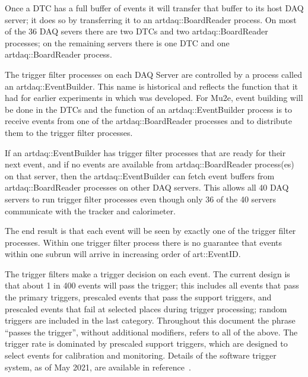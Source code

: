 Once a DTC has a full buffer of events it will transfer that buffer to its host DAQ server;
it does so by transferring it to an {\code artdaq::BoardReader} process.  On most of the
36 DAQ severs there are two DTCs and two {\code artdaq::BoardReader} processes;
on the remaining servers there is one DTC and one {\code artdaq::BoardReader} process.

The trigger filter processes on each DAQ Server are controlled by a process
called an {\code artdaq::EventBuilder}.
This name is historical and reflects the function that it had for earlier experiments in which \artdaq was developed.
For Mu2e, event building will be done in the DTCs and the function of an
{\code artdaq::EventBuilder} process is to receive events from one of
the {\code artdaq::BoardReader} processes and to distribute them to the trigger filter \art processes.

If an {\code artdaq::EventBuilder} has trigger filter processes that are ready for their next event,
and if no events are available from {\code artdaq::BoardReader} process(es) on that server,
then the {\code artdaq::EventBuilder} can fetch event buffers from {\code artdaq::BoardReader} processes
on other DAQ servers.
This allows all 40 DAQ servers to run trigger filter processes even though only 36 of the 40 servers
communicate with the tracker and calorimeter.

The end result is that each event will be seen by exactly one of the trigger filter processes.
Within one trigger filter process there is no guarantee that events within one subrun will arrive in
increasing order of {\code art::EventID}.


The trigger filters make a trigger decision on each event.
The current design is that about 1 in 400 events will pass the trigger;
this includes all events that pass the primary triggers,
prescaled events that pass the support triggers,
and prescaled events that fail at selected places during trigger processing;
random triggers are included in the last category.
Throughout this document the phrase ``passes the trigger'', without additional modifiers,
refers to all of the above.
The trigger rate is dominated by prescaled support triggers,
which are designed to select events for calibration and monitoring.
Details of the software trigger system, as of May 2021,
are available in reference~\cite{TriggerSU2020}.


